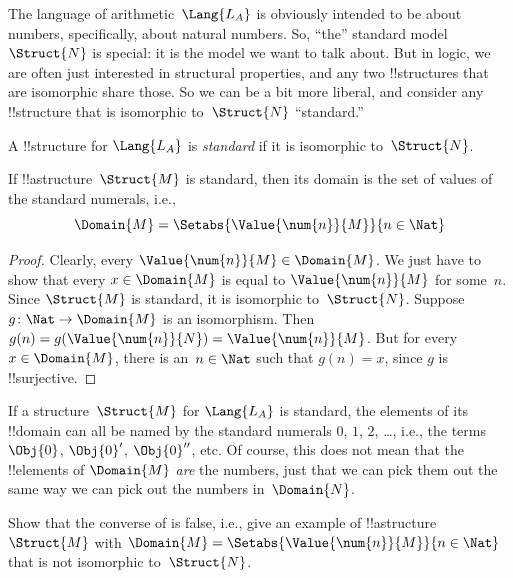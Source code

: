 \documentclass[../../../include/open-logic-section]{subfiles}
\begin{document}

The language of arithmetic~$\Lang{L_A}$ is obviously intended to be
about numbers, specifically, about natural numbers. So, ``the''
standard model~$\Struct{N}$ is special: it is the model we want to
talk about. But in logic, we are often just interested in structural
properties, and any two !!{structure}s that are isomorphic share
those.  So we can be a bit more liberal, and consider any
!!{structure} that is isomorphic to~$\Struct{N}$ ``standard.''

\begin{defn}
A !!{structure} for $\Lang{L_A}$ is \emph{standard} if it is
isomorphic to~$\Struct{N}$.
\end{defn}

\begin{prop}
 If !!a{structure}~$\Struct{M}$ is standard,
then its domain is the set of values of the standard numerals, i.e.,
\[
\Domain{M} = \Setabs{\Value{\num{n}}{M}}{n \in \Nat}
\]
\end{prop}

\begin{proof}
Clearly, every $\Value{\num{n}}{M} \in \Domain{M}$. We just have to
show that every $x \in \Domain{M}$ is equal to $\Value{\num{n}}{M}$
for some~$n$.  Since $\Struct{M}$ is standard, it is isomorphic
to~$\Struct{N}$. Suppose $g\colon \Nat \to \Domain{M}$ is an
isomorphism. Then $g(n) = g(\Value{\num{n}}{N}) =
\Value{\num{n}}{M}$. But for every $x \in \Domain{M}$, there is an~$n
\in \Nat$ such that $g(n) = x$, since $g$ is !!{surjective}.
\end{proof}

\begin{explain}
If a structure~$\Struct{M}$ for $\Lang{L_A}$ is standard, the elements
of its !!{domain} can all be named by the standard numerals $\num{0}$,
$\num{1}$, $\num{2}$, \dots, i.e., the terms $\Obj{0}$, $\Obj{0}'$,
$\Obj{0}''$, etc. Of course, this does not mean that the !!{element}s
of $\Domain{M}$ \emph{are} the numbers, just that we can pick them out
the same way we can pick out the numbers in~$\Domain{N}$.
\end{explain}

\begin{prob}
Show that the converse of 
is false, i.e., give an example of !!a{structure}~$\Struct{M}$ with
$\Domain{M} = \Setabs{\Value{\num{n}}{M}}{n \in \Nat}$ that is not
isomorphic to~$\Struct{N}$.
\end{prob}
\end{document}
